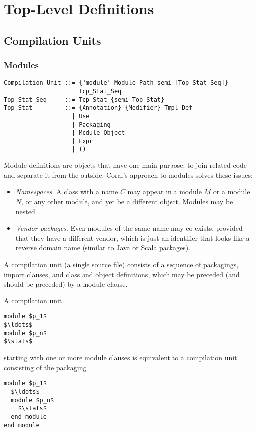 
\chapter{Top-Level Definitions}

\section{Compilation Units}
\label{sec:compilation-units}

\subsection{Modules}
\label{sec:modules}

\syntax\begin{lstlisting}
Compilation_Unit ::= {'module' Module_Path semi [Top_Stat_Seq]} 
                     Top_Stat_Seq
Top_Stat_Seq     ::= Top_Stat {semi Top_Stat}
Top_Stat         ::= {Annotation} {Modifier} Tmpl_Def
                   | Use
                   | Packaging
                   | Module_Object
                   | Expr
                   | ()
\end{lstlisting}

Module definitions are objects that have one main purpose: to join related code and separate it from the outside. Coral's approach to modules solves these issues: 
\begin{itemize}
  \item {\em Namespaces}. A class with a name $C$ may appear in a module $M$ or a module $N$, or any other module, and yet be a different object. Modules may be nested.
  \item {\em Vendor packages}. Even modules of the same name may co-exists, provided that they have a different vendor, which is just an identifier that looks like a reverse domain name (similar to Java or Scala packages). 
\end{itemize}

A compilation unit (a single source file) consists of a sequence of packagings, import clauses, and class and object definitions, which may be preceded (and should be preceded) by a module clause. 

A compilation unit 
\begin{lstlisting}
module $p_1$
$\ldots$
module $p_n$
$\stats$
\end{lstlisting}
starting with one or more module clauses is equivalent to a compilation unit consisting of the packaging
\begin{lstlisting}
module $p_1$
  $\ldots$
  module $p_n$
    $\stats$
  end module
end module
\end{lstlisting}


